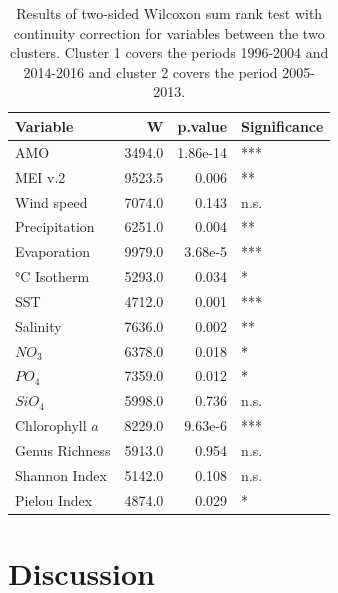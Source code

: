 \documentclass[draft]{agujournal2019}
\begin{document}
\begin{table}
\caption{Results of two-sided Wilcoxon sum rank test with continuity correction for variables between the two clusters. Cluster 1 covers the periods 1996-2004 and 2014-2016 and cluster 2 covers the period 2005-2013.}
\centering
\begin{tabular}[t]{lrrl}
\toprule
Variable & W & p.value & Significance\\
\midrule
AMO & 3494.0 & 1.86e-14 & ***\\
MEI v.2 & 9523.5 & 0.006 & **\\
Wind speed & 7074.0 & 0.143 & n.s.\\
Precipitation & 6251.0 & 0.004 & **\\
Evaporation & 9979.0 & 3.68e-5 & ***\\
\addlinespace
21 °C Isotherm & 5293.0 & 0.034 & *\\
SST & 4712.0 & 0.001 & ***\\
Salinity & 7636.0 & 0.002 & **\\
$NO_3$ & 6378.0 & 0.018 & *\\
$PO_4$ & 7359.0 & 0.012 & *\\
$SiO_4$ & 5998.0 & 0.736 & n.s.\\
\addlinespace
Chlorophyll $a$ & 8229.0 & 9.63e-6 & ***\\
Genus Richness & 5913.0 & 0.954 & n.s.\\
Shannon Index & 5142.0 & 0.108 & n.s.\\
Pielou Index & 4874.0 & 0.029 & *\\
\bottomrule
\end{tabular}

\label{tab:ClustCompWilcox}
\end{table}



\section{Discussion}
\end{document}
